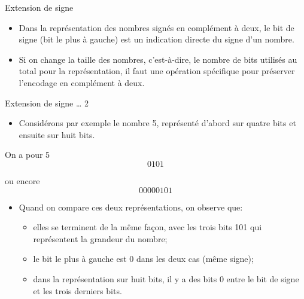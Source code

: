 \documentclass[presentation]{beamer}
\begin{document}
\begin{frame}[label={sec:orgdc33fed}]{Extension de signe}
\begin{itemize}
\item Dans la représentation des nombres signés en complément à deux, le bit de signe (bit le plus à gauche) est un indication directe du signe d'un nombre.

\item Si on change la taille des nombres, c'est-à-dire, le nombre de bits utilisés au total pour la représentation, il faut une opération spécifique pour préserver l'encodage en complément à deux.
\end{itemize}
\end{frame}

\begin{frame}[label={sec:orgf0ffbc1}]{Extension de signe \ldots{} 2}
\begin{itemize}
\item Considérons par exemple le nombre 5, représenté d'abord sur quatre bits et ensuite sur huit bits.
\end{itemize}

On a pour 5 $$ 0101 $$

ou encore $$ 00000101 $$

\begin{itemize}
\item Quand on compare ces deux représentations, on observe que: 

\begin{itemize}
\item elles se terminent de la même façon, avec les trois bits 101 qui représentent la grandeur du nombre;
\item le bit le plus à gauche est 0 dans les deux cas (même signe);
\item dans la représentation sur huit bits, il y a des bits 0 entre le bit  de signe et les trois derniers bits.
\end{itemize}
\end{itemize}
\end{frame}
\end{document}
